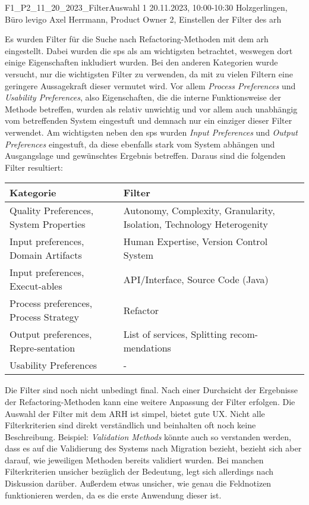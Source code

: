 \fieldnote
{F1\_P2\_11\_20\_2023\_FilterAuswahl}
{1}
{20.11.2023, 10:00-10:30}
{Holzgerlingen, Büro levigo}
{Axel Herrmann, Product Owner}
{2, Einstellen der Filter des \gls{arh}}
{
	Es wurden Filter für die Suche nach Refactoring-Methoden mit dem \gls{arh} eingestellt.
	Dabei wurden die \glspl{sp} als am wichtigsten betrachtet, weswegen dort einige Eigenschaften inkludiert wurden.
	Bei den anderen Kategorien wurde versucht, nur die wichtigsten Filter zu verwenden, da mit zu vielen Filtern eine geringere Aussagekraft dieser vermutet wird.
	Vor allem \emph{Process Preferences} und \emph{Usability Preferences}, also Eigenschaften, die die interne Funktionsweise der Methode betreffen, wurden als relativ unwichtig und vor allem auch unabhängig vom betreffenden System eingestuft und demnach nur ein einziger dieser Filter verwendet.
	Am wichtigsten neben den \glspl{sp} wurden \emph{Input Preferences} und \emph{Output Preferences} eingestuft, da diese ebenfalls stark vom System abhängen und Ausgangslage und gewünschtes Ergebnis betreffen.
	Daraus sind die folgenden Filter resultiert:
	\begin{tabular}{|p{4.5cm}|p{5.5cm}|}
		\hline
		\textbf{Kategorie} & \textbf{Filter} \\ \hline
		Quality Preferences, System Properties & Autonomy, Complexity, Granularity, Isolation, Technology Heterogenity \\ \hline
		Input preferences, Domain Artifacts & Human Expertise, Version Control System \\ \hline
		Input preferences, Execut-ables & API/Interface, Source Code (Java) \\ \hline
		Process preferences, Process Strategy & Refactor \\ \hline
		Output preferences, Repre-sentation & List of services, Splitting recom-mendations \\ \hline
		Usability Preferences & - \\ \hline
	\end{tabular}
}
{
	Die Filter sind noch nicht unbedingt final. Nach einer Durchsicht der Ergebnisse der Refactoring-Methoden kann eine weitere Anpassung der Filter erfolgen.
}
{
	Die Auswahl der Filter mit dem ARH ist simpel, bietet gute UX.
}
{
	Nicht alle Filterkriterien sind direkt verständlich und beinhalten oft noch keine Beschreibung. Beispiel: \emph{Validation Methods} könnte auch so verstanden werden, dass es auf die Validierung des Systems nach Migration bezieht, bezieht sich aber darauf, wie jeweiligen Methoden bereits validiert wurden.
}
{
	Bei manchen Filterkriterien unsicher bezüglich der Bedeutung, legt sich allerdings nach Diskussion darüber.
	Außerdem etwas unsicher, wie genau die Feldnotizen funktionieren werden, da es die erste Anwendung dieser ist.
}
